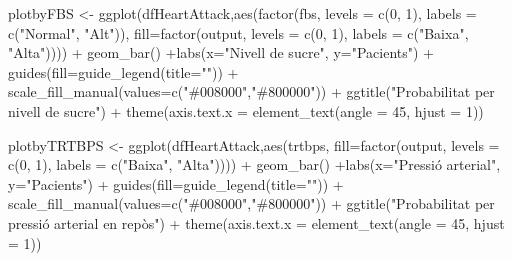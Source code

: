 \documentclass[
]{article}
\newenvironment{Shaded}{\begin{snugshade}}{\end{snugshade}}
\newcommand{\AttributeTok}[1]{\textcolor[rgb]{0.80,0.80,0.80}{#1}}
\newcommand{\DecValTok}[1]{\textcolor[rgb]{0.86,0.86,0.80}{#1}}
\newcommand{\FunctionTok}[1]{\textcolor[rgb]{0.94,0.94,0.56}{#1}}
\newcommand{\NormalTok}[1]{\textcolor[rgb]{0.80,0.80,0.80}{#1}}
\newcommand{\OtherTok}[1]{\textcolor[rgb]{0.94,0.94,0.56}{#1}}
\newcommand{\SpecialCharTok}[1]{\textcolor[rgb]{0.86,0.64,0.64}{#1}}
\newcommand{\StringTok}[1]{\textcolor[rgb]{0.80,0.58,0.58}{#1}}
\begin{document}
\begin{Shaded}
\begin{Highlighting}[]
\NormalTok{plotbyFBS }\OtherTok{\textless{}{-}} \FunctionTok{ggplot}\NormalTok{(dfHeartAttack,}\FunctionTok{aes}\NormalTok{(}\FunctionTok{factor}\NormalTok{(fbs, }\AttributeTok{levels =} \FunctionTok{c}\NormalTok{(}\DecValTok{0}\NormalTok{, }\DecValTok{1}\NormalTok{), }\AttributeTok{labels =} \FunctionTok{c}\NormalTok{(}\StringTok{"Normal"}\NormalTok{, }\StringTok{"Alt"}\NormalTok{)), }\AttributeTok{fill=}\FunctionTok{factor}\NormalTok{(output, }\AttributeTok{levels =} \FunctionTok{c}\NormalTok{(}\DecValTok{0}\NormalTok{, }\DecValTok{1}\NormalTok{), }\AttributeTok{labels =} \FunctionTok{c}\NormalTok{(}\StringTok{"Baixa"}\NormalTok{, }\StringTok{"Alta"}\NormalTok{)))) }\SpecialCharTok{+} 
                    \FunctionTok{geom\_bar}\NormalTok{() }\SpecialCharTok{+}\FunctionTok{labs}\NormalTok{(}\AttributeTok{x=}\StringTok{"Nivell de sucre"}\NormalTok{, }\AttributeTok{y=}\StringTok{"Pacients"}\NormalTok{) }\SpecialCharTok{+} 
                    \FunctionTok{guides}\NormalTok{(}\AttributeTok{fill=}\FunctionTok{guide\_legend}\NormalTok{(}\AttributeTok{title=}\StringTok{""}\NormalTok{)) }\SpecialCharTok{+} 
                  \FunctionTok{scale\_fill\_manual}\NormalTok{(}\AttributeTok{values=}\FunctionTok{c}\NormalTok{(}\StringTok{"\#008000"}\NormalTok{,}\StringTok{"\#800000"}\NormalTok{)) }\SpecialCharTok{+} 
                    \FunctionTok{ggtitle}\NormalTok{(}\StringTok{"Probabilitat per nivell de sucre"}\NormalTok{) }\SpecialCharTok{+}
          \FunctionTok{theme}\NormalTok{(}\AttributeTok{axis.text.x =} \FunctionTok{element\_text}\NormalTok{(}\AttributeTok{angle =} \DecValTok{45}\NormalTok{, }\AttributeTok{hjust =} \DecValTok{1}\NormalTok{))}

\NormalTok{plotbyTRTBPS }\OtherTok{\textless{}{-}} \FunctionTok{ggplot}\NormalTok{(dfHeartAttack,}\FunctionTok{aes}\NormalTok{(trtbps, }\AttributeTok{fill=}\FunctionTok{factor}\NormalTok{(output, }\AttributeTok{levels =} \FunctionTok{c}\NormalTok{(}\DecValTok{0}\NormalTok{, }\DecValTok{1}\NormalTok{), }\AttributeTok{labels =} \FunctionTok{c}\NormalTok{(}\StringTok{"Baixa"}\NormalTok{, }\StringTok{"Alta"}\NormalTok{)))) }\SpecialCharTok{+} 
                    \FunctionTok{geom\_bar}\NormalTok{() }\SpecialCharTok{+}\FunctionTok{labs}\NormalTok{(}\AttributeTok{x=}\StringTok{"Pressió arterial"}\NormalTok{, }\AttributeTok{y=}\StringTok{"Pacients"}\NormalTok{) }\SpecialCharTok{+} 
                    \FunctionTok{guides}\NormalTok{(}\AttributeTok{fill=}\FunctionTok{guide\_legend}\NormalTok{(}\AttributeTok{title=}\StringTok{""}\NormalTok{)) }\SpecialCharTok{+} 
                  \FunctionTok{scale\_fill\_manual}\NormalTok{(}\AttributeTok{values=}\FunctionTok{c}\NormalTok{(}\StringTok{"\#008000"}\NormalTok{,}\StringTok{"\#800000"}\NormalTok{)) }\SpecialCharTok{+} 
                    \FunctionTok{ggtitle}\NormalTok{(}\StringTok{"Probabilitat per pressió arterial en repòs"}\NormalTok{) }\SpecialCharTok{+}
          \FunctionTok{theme}\NormalTok{(}\AttributeTok{axis.text.x =} \FunctionTok{element\_text}\NormalTok{(}\AttributeTok{angle =} \DecValTok{45}\NormalTok{, }\AttributeTok{hjust =} \DecValTok{1}\NormalTok{))}


\end{Highlighting}
\end{Shaded}
\end{document}
